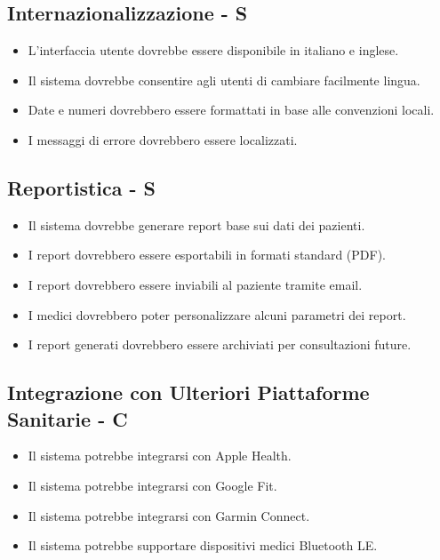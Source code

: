 \documentclass[12pt,a4paper,oneside]{report}
\begin{document}
\subsection{Internazionalizzazione - S}

\begin{itemize}
    \item L'interfaccia utente dovrebbe essere disponibile in italiano e inglese.
    \item Il sistema dovrebbe consentire agli utenti di cambiare facilmente lingua.
    \item Date e numeri dovrebbero essere formattati in base alle convenzioni locali.
    \item I messaggi di errore dovrebbero essere localizzati.
\end{itemize}

\subsection{Reportistica - S}

\begin{itemize}
    \item Il sistema dovrebbe generare report base sui dati dei pazienti.
    \item I report dovrebbero essere esportabili in formati standard (PDF).
    \item I report dovrebbero essere inviabili al paziente tramite email.
    \item I medici dovrebbero poter personalizzare alcuni parametri dei report.
    \item I report generati dovrebbero essere archiviati per consultazioni future.
\end{itemize}

\subsection{Integrazione con Ulteriori Piattaforme Sanitarie - C}

\begin{itemize}
    \item Il sistema potrebbe integrarsi con Apple Health.
    \item Il sistema potrebbe integrarsi con Google Fit.
    \item Il sistema potrebbe integrarsi con Garmin Connect.
    \item Il sistema potrebbe supportare dispositivi medici Bluetooth LE.
\end{itemize}
\end{document}
